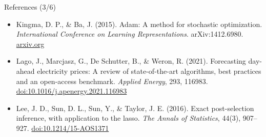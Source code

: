 \begin{frame}{References (3/6)}
\begin{itemize}
    \item Kingma, D. P., \& Ba, J. (2015). Adam: A method for stochastic optimization. \textit{International Conference on Learning Representations}. arXiv:1412.6980. \href{https://arxiv.org/abs/1412.6980}{arxiv.org}
    \item Lago, J., Marcjasz, G., De Schutter, B., \& Weron, R. (2021). Forecasting day-ahead electricity prices: A review of state-of-the-art algorithms, best practices and an open-access benchmark. \textit{Applied Energy}, 293, 116983. \href{https://doi.org/10.1016/j.apenergy.2021.116983}{doi:10.1016/j.apenergy.2021.116983}
    \item Lee, J. D., Sun, D. L., Sun, Y., \& Taylor, J. E. (2016). Exact post-selection inference, with application to the lasso. \textit{The Annals of Statistics}, 44(3), 907--927. \href{https://doi.org/10.1214/15-AOS1371}{doi:10.1214/15-AOS1371}
\end{itemize}
\end{frame}

